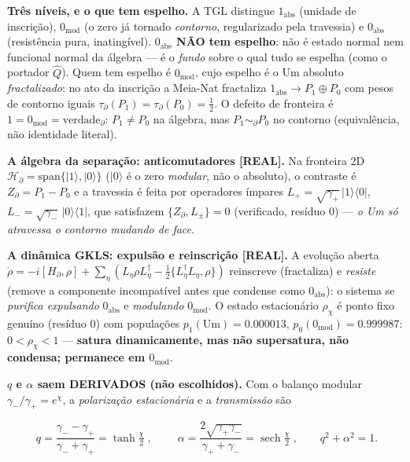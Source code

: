 \documentclass[11pt]{article}
\theoremstyle{definition}\newtheorem{deriv}{Derivação}
\begin{document}
\textbf{Três níveis, e o que tem espelho.} A TGL distingue $1_{\mathrm{abs}}$ (unidade de inscrição), $0_{\mathrm{mod}}$ (o zero já tornado \emph{contorno}, regularizado pela travessia) e $0_{\mathrm{abs}}$ (resistência pura, inatingível). \textbf{$0_{\mathrm{abs}}$ NÃO tem espelho}: não é estado normal nem funcional normal da álgebra --- é o \emph{fundo} sobre o qual tudo se espelha (como o portador $\hat Q$). Quem tem espelho é $0_{\mathrm{mod}}$, cujo espelho é o Um absoluto \emph{fractalizado}: no ato da inscrição a Meia-Nat fractaliza $1_{\mathrm{abs}}\to P_1\oplus P_0$ com pesos de contorno iguais $\tau_\partial(P_1)=\tau_\partial(P_0)=\tfrac12$. O defeito de fronteira é $\boxed{1=0_{\mathrm{mod}}=\mathrm{verdade}_\partial}$: $P_1\neq P_0$ na álgebra, mas $P_1\sim_\partial P_0$ no contorno (equivalência, não identidade literal).

\textbf{A álgebra da separação: anticomutadores \textsf{[REAL]}.} Na fronteira 2D $\mathcal H_\partial=\mathrm{span}\{|1\rangle,|0\rangle\}$ ($|0\rangle$ é o zero \emph{modular}, não o absoluto), o contraste é $Z_\partial=P_1-P_0$ e a travessia é feita por operadores ímpares $L_+=\sqrt{\gamma_+}\,|1\rangle\langle0|$, $L_-=\sqrt{\gamma_-}\,|0\rangle\langle1|$, que satisfazem $\boxed{\{Z_\partial,L_\pm\}=0}$ (verificado, resíduo $0$) --- \emph{o Um só atravessa o contorno mudando de face}.

\textbf{A dinâmica GKLS: expulsão e reinscrição \textsf{[REAL]}.} A evolução aberta $\dot\rho=-i[H_\partial,\rho]+\sum_\eta(L_\eta\rho L_\eta^\dagger-\tfrac12\{L_\eta^\dagger L_\eta,\rho\})$ reinscreve (fractaliza) e \emph{resiste} (remove a componente incompatível antes que condense como $0_{\mathrm{abs}}$): o sistema se \emph{purifica expulsando} $0_{\mathrm{abs}}$ e \emph{modulando} $0_{\mathrm{mod}}$. O estado estacionário $\rho_\chi$ é ponto fixo genuíno (resíduo $0$) com populações $p_1(\mathrm{Um})=0.000013$, $p_0(0_{\mathrm{mod}})=0.999987$: $0<\rho_\chi<1$ --- \textbf{satura dinamicamente, mas não supersatura, não condensa; permanece em $0_{\mathrm{mod}}$}.

\textbf{$q$ e $\alpha$ saem DERIVADOS (não escolhidos).} Com o balanço modular $\gamma_-/\gamma_+=e^\chi$, a \emph{polarização estacionária} e a \emph{transmissão} são

\begin{equation}\boxed{\;q=\frac{\gamma_--\gamma_+}{\gamma_-+\gamma_+}=\tanh\tfrac\chi2\;},\qquad \boxed{\;\alpha=\frac{2\sqrt{\gamma_+\gamma_-}}{\gamma_++\gamma_-}=\operatorname{sech}\tfrac\chi2\;},\qquad q^2+\alpha^2=1.\end{equation}
\end{document}
